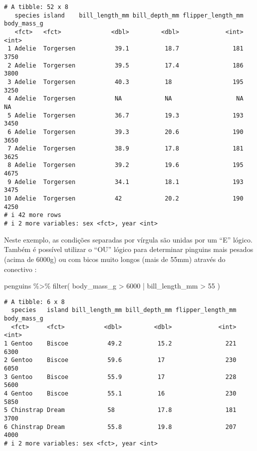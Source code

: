 \documentclass[
  12pt,
  letterpaper,
  DIV=11,
  numbers=noendperiod]{scrreprt}
\newenvironment{Shaded}{\begin{snugshade}}{\end{snugshade}}
\newcommand{\DecValTok}[1]{\textcolor[rgb]{0.68,0.00,0.00}{#1}}
\newcommand{\FunctionTok}[1]{\textcolor[rgb]{0.28,0.35,0.67}{#1}}
\newcommand{\NormalTok}[1]{\textcolor[rgb]{0.00,0.23,0.31}{#1}}
\newcommand{\SpecialCharTok}[1]{\textcolor[rgb]{0.37,0.37,0.37}{#1}}
\begin{document}
\begin{verbatim}
# A tibble: 52 x 8
   species island    bill_length_mm bill_depth_mm flipper_length_mm body_mass_g
   <fct>   <fct>              <dbl>         <dbl>             <int>       <int>
 1 Adelie  Torgersen           39.1          18.7               181        3750
 2 Adelie  Torgersen           39.5          17.4               186        3800
 3 Adelie  Torgersen           40.3          18                 195        3250
 4 Adelie  Torgersen           NA            NA                  NA          NA
 5 Adelie  Torgersen           36.7          19.3               193        3450
 6 Adelie  Torgersen           39.3          20.6               190        3650
 7 Adelie  Torgersen           38.9          17.8               181        3625
 8 Adelie  Torgersen           39.2          19.6               195        4675
 9 Adelie  Torgersen           34.1          18.1               193        3475
10 Adelie  Torgersen           42            20.2               190        4250
# i 42 more rows
# i 2 more variables: sex <fct>, year <int>
\end{verbatim}

Neste exemplo, as condições separadas por vírgula são unidas por um
``E'' lógico. Também é possível utilizar o ``OU'' lógico para determinar
pinguins mais pesados (acima de 6000g) ou com bicos muito longos (mais
de 55mm) através do conectivo \texttt{\textbar{}}:

\begin{Shaded}
\begin{Highlighting}[]
\NormalTok{penguins }\SpecialCharTok{\%\textgreater{}\%} 
  \FunctionTok{filter}\NormalTok{(}
\NormalTok{    body\_mass\_g }\SpecialCharTok{\textgreater{}} \DecValTok{6000} \SpecialCharTok{|}\NormalTok{ bill\_length\_mm }\SpecialCharTok{\textgreater{}} \DecValTok{55}
\NormalTok{  )}
\end{Highlighting}
\end{Shaded}

\begin{verbatim}
# A tibble: 6 x 8
  species   island bill_length_mm bill_depth_mm flipper_length_mm body_mass_g
  <fct>     <fct>           <dbl>         <dbl>             <int>       <int>
1 Gentoo    Biscoe           49.2          15.2               221        6300
2 Gentoo    Biscoe           59.6          17                 230        6050
3 Gentoo    Biscoe           55.9          17                 228        5600
4 Gentoo    Biscoe           55.1          16                 230        5850
5 Chinstrap Dream            58            17.8               181        3700
6 Chinstrap Dream            55.8          19.8               207        4000
# i 2 more variables: sex <fct>, year <int>
\end{verbatim}
\end{document}
